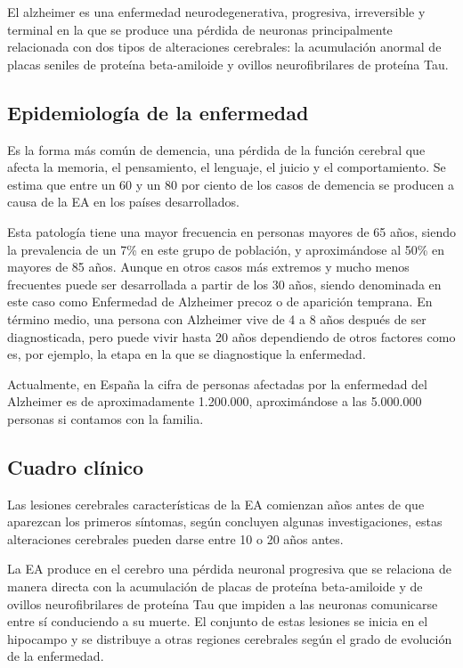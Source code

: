 
El alzheimer es una enfermedad neurodegenerativa, progresiva, irreversible y terminal en la que se produce una pérdida
de neuronas principalmente relacionada con dos tipos de alteraciones cerebrales: la acumulación anormal de placas
seniles de proteína beta-amiloide y ovillos neurofibrilares de proteína Tau.

\subsection{Epidemiología de la enfermedad}\label{subsec:epidemiologia}
Es la forma más común de demencia, una pérdida de la función cerebral que afecta la memoria, el pensamiento, el
lenguaje, el juicio y el comportamiento.
Se estima que entre un 60 y un 80 por ciento de los casos de demencia se producen a causa de la EA en los países
desarrollados.

Esta patología tiene una mayor frecuencia en personas mayores de 65 años, siendo la prevalencia de un 7\% en este grupo
de población, y aproximándose al 50\% en mayores de 85 años.
Aunque en otros casos más extremos y mucho menos frecuentes puede ser desarrollada a partir de los 30 años, siendo
denominada en este caso como Enfermedad de Alzheimer precoz o de aparición temprana.
En término medio, una persona con Alzheimer vive de 4 a 8 años después de ser diagnosticada, pero puede vivir hasta 20
años dependiendo de otros factores como es, por ejemplo, la etapa en la que se diagnostique la enfermedad.

Actualmente, en España la cifra de personas afectadas por la enfermedad del Alzheimer es de aproximadamente 1.200.000,
aproximándose a las 5.000.000 personas si contamos con la familia.

\subsection{Cuadro clínico}\label{subsec:cuadro-clinico}
Las lesiones cerebrales características de la EA comienzan años antes de que aparezcan los primeros síntomas, según
concluyen algunas investigaciones, estas alteraciones cerebrales pueden darse entre 10 o 20 años antes.

La EA produce en el cerebro una pérdida neuronal progresiva que se relaciona de manera directa con la acumulación de
placas de proteína beta-amiloide y de ovillos neurofibrilares de proteína Tau que impiden a las neuronas comunicarse
entre sí conduciendo a su muerte.
El conjunto de estas lesiones se inicia en el hipocampo y se distribuye a otras regiones cerebrales según el grado de
evolución de la enfermedad.

